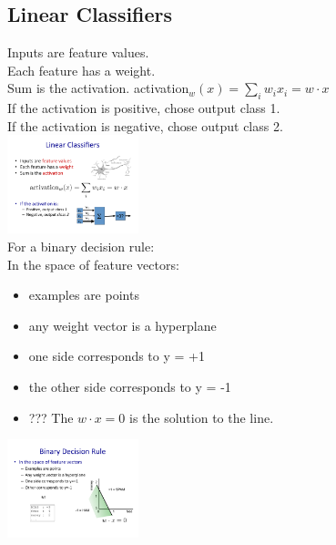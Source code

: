  \subsection{Linear Classifiers}
 Inputs are feature values.  \hfill \\
 Each feature has a weight.  \hfill \\
 Sum is the activation.  activation$_w(x) = \sum_i w_i x_i = w \cdot x$  \hfill \\
 If the activation is positive, chose output class 1.  \hfill \\
 If the activation is negative, chose output class 2.  \hfill \\
 
 \includegraphics[width=1.5in]{figures/linear_classifier_cartoon.pdf}  \hfill \\
 
 For a binary decision rule:   \hfill \\
 In the space of feature vectors: 
 \begin{itemize}
 	\item examples are points
	\item any weight vector is a hyperplane
	\item one side corresponds to y = +1
	\item the other side corresponds to y = -1
	\item ??? The $w \cdot x = 0$ is the solution to the line.
 \end{itemize}
 
 \includegraphics[width=1.5in]{figures/binary_decision_rule.pdf}
 
